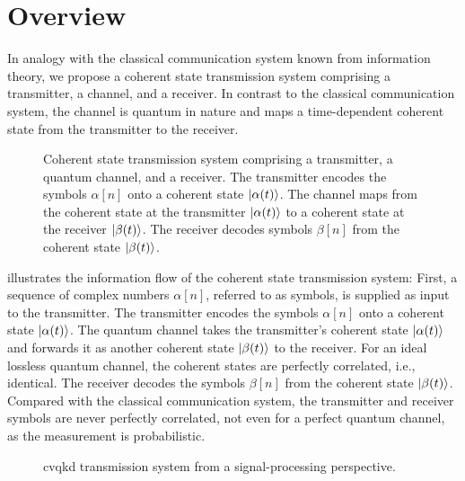 \section{Overview}

In analogy with the classical communication system known from information theory, we propose a coherent state transmission system comprising a transmitter, a channel, and a receiver.
In contrast to the classical communication system, the channel is quantum in nature and maps a time-dependent coherent state from the transmitter to the receiver.
\begin{figure}[htb]
	\centering
	
	\caption{Coherent state transmission system comprising a transmitter, a quantum channel, and a receiver. The transmitter encodes the symbols $\alpha[n]$ onto a coherent state $\ket{\alpha(t)}$. The channel maps from the coherent state at the transmitter $\ket{\alpha(t)}$ to a coherent state at the receiver $\ket{\beta(t)}$. The receiver decodes symbols $\beta[n]$ from the coherent state $\ket{\beta(t)}$.}\label{fig:transmission_system}
\end{figure}
 illustrates the information flow of the coherent state transmission system:
First, a sequence of complex numbers $\alpha[n]$, referred to as symbols, is supplied as input to the transmitter.
The transmitter encodes the symbols $\alpha[n]$ onto a coherent state $\ket{\alpha(t)}$.
The quantum channel takes the transmitter's coherent state $\ket{\alpha(t)}$ and forwards it as another coherent state $\ket{\beta(t)}$ to the receiver.
For an ideal lossless quantum channel, the coherent states are perfectly correlated, i.e., identical.
The receiver decodes the symbols $\beta[n]$ from the coherent state $\ket{\beta(t)}$.
Compared with the classical communication system, the transmitter and receiver symbols are never perfectly correlated, not even for a perfect quantum channel, as the measurement is probabilistic.
\begin{figure}[htb]
	\centering
	
	\caption{\Gls{cvqkd} transmission system from a signal-processing perspective.}
\end{figure}
